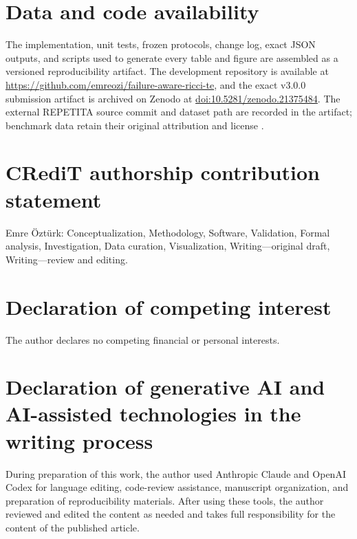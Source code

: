 \documentclass[preprint,12pt]{elsarticle}
\begin{document}
\section*{Data and code availability}

The implementation, unit tests, frozen protocols, change log, exact JSON
outputs, and scripts used to generate every table and figure are assembled as a
versioned reproducibility artifact. The development repository is available at
\url{https://github.com/emreozi/failure-aware-ricci-te}, and the exact v3.0.0
submission artifact is archived on Zenodo at
\href{https://doi.org/10.5281/zenodo.21375484}{doi:10.5281/zenodo.21375484}.
The external REPETITA source commit and dataset path are recorded in the
artifact; benchmark data retain their original attribution and license
\cite{gay2017repetita}.

\section*{CRediT authorship contribution statement}

Emre Öztürk: Conceptualization, Methodology, Software, Validation, Formal
analysis, Investigation, Data curation, Visualization, Writing---original
draft, Writing---review and editing.

\section*{Declaration of competing interest}

The author declares no competing financial or personal interests.

\section*{Declaration of generative AI and AI-assisted technologies in the
writing process}

During preparation of this work, the author used Anthropic Claude and OpenAI
Codex for language editing, code-review assistance, manuscript organization,
and preparation of reproducibility materials. After using these tools, the
author reviewed and edited the content as needed and takes full responsibility
for the content of the published article.



\end{document}
